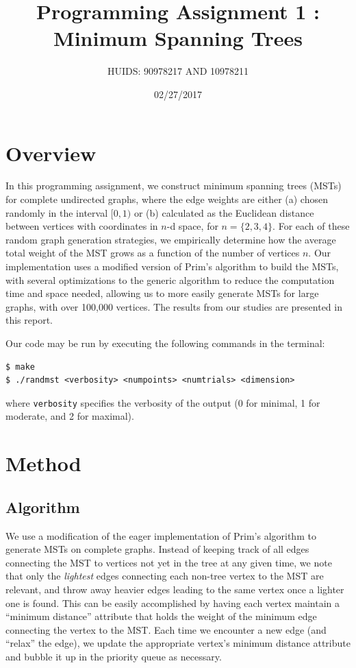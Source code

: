 \documentclass[a4paper]{article}
\title{Programming Assignment 1 : Minimum Spanning Trees}
\author{HUIDS: 90978217 AND 10978211}
\date{02/27/2017}
\begin{document}
\maketitle

\section{Overview}
In this programming assignment, we construct minimum spanning trees (MSTs) for complete undirected graphs, where the edge weights are either (a) chosen randomly in the interval $[0, 1)$ or (b) calculated as the Euclidean distance between vertices with coordinates in $n$-d space, for $n=\{2,3,4\}$. For each of these random graph generation strategies, we empirically determine how the average total weight of the MST grows as a function of the number of vertices $n$. Our implementation uses a modified version of Prim's algorithm to build the MSTs, with several optimizations to the generic algorithm to reduce the computation time and space needed, allowing us to more easily generate MSTs for large graphs, with over 100,000 vertices. The results from our studies are presented in this report.

Our code may be run by executing the following commands in the terminal:
\begin{verbatim}
$ make
$ ./randmst <verbosity> <numpoints> <numtrials> <dimension>
\end{verbatim}
where \texttt{verbosity} specifies the verbosity of the output (0 for minimal, 1 for moderate, and 2 for maximal).

\section{Method}
\subsection{Algorithm}
We use a modification of the eager implementation of Prim's algorithm to generate MSTs on complete graphs. Instead of keeping track of all edges connecting the MST to vertices not yet in the tree at any given time, we note that only the \textit{lightest} edges connecting each non-tree vertex to the MST are relevant, and throw away heavier edges leading to the same vertex once a lighter one is found. This can be easily accomplished by having each vertex maintain a ``minimum distance'' attribute that holds the weight of the minimum edge connecting the vertex to the MST. Each time we encounter a new edge (and ``relax'' the edge), we update the appropriate vertex's minimum distance attribute and bubble it up in the priority queue as necessary.
\end{document}
